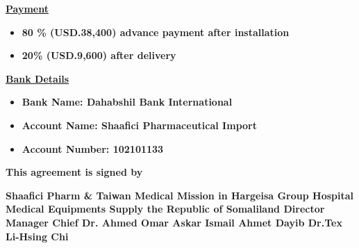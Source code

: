 \documentclass[
]{article}
\begin{document}
\textbf{\ul{Payment}}

\begin{itemize}
\item
  \textbf{80 \% (USD.38,400) advance payment after installation}
\item
  \textbf{20\% (USD.9,600) after delivery}
\end{itemize}

\textbf{\ul{Bank Details}}

\begin{itemize}
\item
  \textbf{Bank Name: Dahabshil Bank International}
\item
  \textbf{Account Name: Shaafici Pharmaceutical Import}
\item
  \textbf{Account Number: 102101133}
\end{itemize}

\textbf{This agreement is signed by}

\textbf{Shaafici Pharm \& Taiwan Medical Mission in Hargeisa Group
Hospital Medical Equipments Supply the Republic of Somaliland Director
Manager Chief Dr. Ahmed Omar Askar Ismail Ahmet Dayib Dr.Tex Li-Hsing
Chi}
\end{document}
